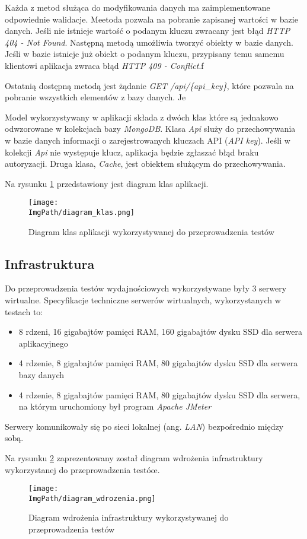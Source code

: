 Każda z metod służąca do modyfikowania danych ma zaimplementowane odpowiednie walidacje. Meetoda \textsl{} pozwala na pobranie zapisanej wartości w bazie danych. Jeśli nie istnieje wartość o podanym kluczu zwracany jest błąd \textsl{HTTP 404 - Not Found}. Następną metodą umożliwia tworzyć obiekty w bazie danych. Jeśli w bazie istnieje już obiekt o podanym kluczu, przypisany temu samemu klientowi aplikacja zwraca błąd \textsl{HTTP 409 - Conflict}.f

Ostatnią dostępną metodą jest żądanie \textsl{GET /api/\{api\_key\}}, które pozwala na pobranie wszystkich elementów z bazy danych. Je

Model wykorzystywany w aplikacji składa z dwóch klas które są jednakowo odwzorowane w kolekcjach bazy \textsl{MongoDB}. Klasa \textsl{Api} służy do przechowywania w bazie danych informacji o zarejestrowanych kluczach API (\textsl{API key}). Jeśli w kolekcji \textsl{Api} nie występuje klucz, aplikacja będzie zgłaszać błąd braku autoryzacji. Druga klasa, \textsl{Cache}, jest obiektem służącym do przechowywania.

Na rysunku \ref{fig:class_diagram} przedstawiony jest diagram klas aplikacji. 
\begin{figure}[!ht]
\centering
\texttt{[image: \\ImgPath/diagram\_klas.png]}
\caption{Diagram klas aplikacji wykorzystywanej do przeprowadzenia testów}
\label{fig:class_diagram}
\end{figure}

\subsection{Infrastruktura}
Do przeprowadzenia testów wydajnościowych wykorzystywane były 3 serwery wirtualne. Specyfikacje techniczne serwerów wirtualnych, wykorzystanych w testach to: 
\begin{itemize}
    \item 8 rdzeni, 16 gigabajtów pamięci RAM, 160 gigabajtów dysku SSD dla serwera aplikacyjnego
    \item 4 rdzenie, 8 gigabajtów pamięci RAM, 80 gigabajtów dysku SSD dla serwera bazy danych 
    \item 4 rdzenie, 8 gigabajtów pamięci RAM, 80 gigabajtów dysku SSD dla serwera, na którym uruchomiony był program \textsl{Apache JMeter}
\end{itemize}
Serwery komunikowały się po sieci lokalnej (ang. \textsl{LAN}) bezpośrednio między sobą.

Na rysunku \ref{fig:deployment_diagram} zaprezentowany został diagram wdrożenia infrastruktury wykorzystanej do przeprowadzenia testóœ.
\begin{figure}[!ht]
\centering
\texttt{[image: \\ImgPath/diagram\_wdrozenia.png]}
\caption{Diagram wdrożenia infrastruktury wykorzystywanej do przeprowadzenia testów}
\label{fig:deployment_diagram}
\end{figure}


